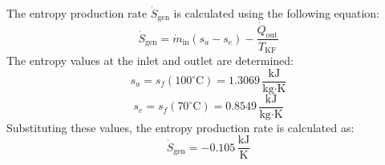 The entropy production rate \( \dot{S}_{\text{gen}} \) is calculated using the following equation:  
\[
\dot{S}_{\text{gen}} = \dot{m}_{\text{in}} (s_a - s_e) - \frac{\dot{Q}_{\text{out}}}{T_{\text{KF}}}
\]  
The entropy values at the inlet and outlet are determined:  
\[
s_a = s_f(100^\circ\text{C}) = 1.3069 \, \frac{\text{kJ}}{\text{kg·K}}
\]  
\[
s_e = s_f(70^\circ\text{C}) = 0.8549 \, \frac{\text{kJ}}{\text{kg·K}}
\]  
Substituting these values, the entropy production rate is calculated as:  
\[
\dot{S}_{\text{gen}} = -0.105 \, \frac{\text{kJ}}{\text{K}}
\]